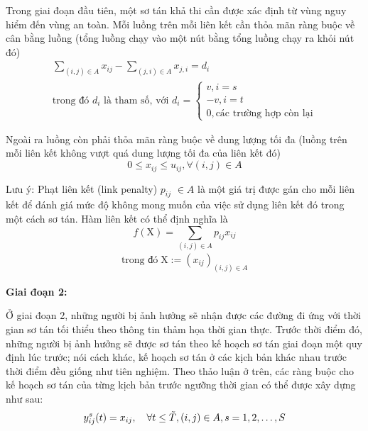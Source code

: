 \documentclass[a4paper]{article}
\begin{document}
    Trong giai đoạn đầu tiên, một sơ tán khả thi cần được xác định từ vùng nguy hiểm đến vùng an toàn. Mỗi luồng trên mỗi liên kết cần thỏa mãn ràng buộc về cân bằng luồng (tổng luồng chạy vào một nút bằng tổng luồng chạy ra khỏi nút đó)
    \begin{gather*}
        \sum\limits_{(i,j) \in A} x_{ij} - \sum\limits_{(j,i) \in A} x_{j,i} = d_i\\
        \text{trong đó $d_i$ là tham số, với $d_i =$}
        \begin{cases}
            v,i = s \\
            -v,i = t\\
            0, \text{các trường hợp còn lại}
        \end{cases}
    \end{gather*}

    Ngoài ra luồng còn phải thỏa mãn ràng buộc về dung lượng tối đa (luồng trên mỗi liên kết không vượt quá dung lượng tối đa của liên kết đó)
    \begin{displaymath}
        0 \leq x_{ij} \leq u_{ij}, \forall (i,j) \in A
    \end{displaymath}

    Lưu ý:  Phạt liên kết (link penalty) $p_{ij}$ $\in A$ là một giá trị được gán cho mỗi liên kết để đánh giá mức độ không mong muốn của việc sử dụng liên kết đó trong một cách sơ tán. Hàm liên kết có thể định nghĩa là
    \begin{displaymath}
        f(\boldsymbol{\mathrm{X}}) = \sum\limits_{(i,j) \in A} p_{ij}x_{ij}
    \end{displaymath}
    \begin{gather*}
        \text{trong đó} \;
        \boldsymbol{\mathrm{X}} \mathrel{:=} (x_{ij})_{(i,j) \in A}
    \end{gather*}

    \textbf{Giai đoạn 2:}

    Ở giai đoạn 2, những người bị ảnh hưởng sẽ nhận được các đường đi ứng với thời gian sơ tán tối thiểu theo thông tin thảm họa thời gian thực. 
    Trước thời điểm đó, những người bị ảnh hưởng sẽ được sơ tán theo kế hoạch sơ tán giai đoạn một quy định lúc trước; nói cách khác, kế hoạch sơ tán ở các kịch bản khác nhau trước thời điểm đều giống như tiên nghiệm. 
    Theo thảo luận ở trên, các ràng buộc cho kế hoạch sơ tán của từng kịch bản trước ngưỡng thời gian có thể được xây dựng như sau:
    \begin{displaymath}
        y_{ij}^s(t) = x_{ij}, \quad \forall t \leq \Tilde{T}, (i,j) \in A, s = 1, 2, \dots, S
    \end{displaymath}
\end{document}

